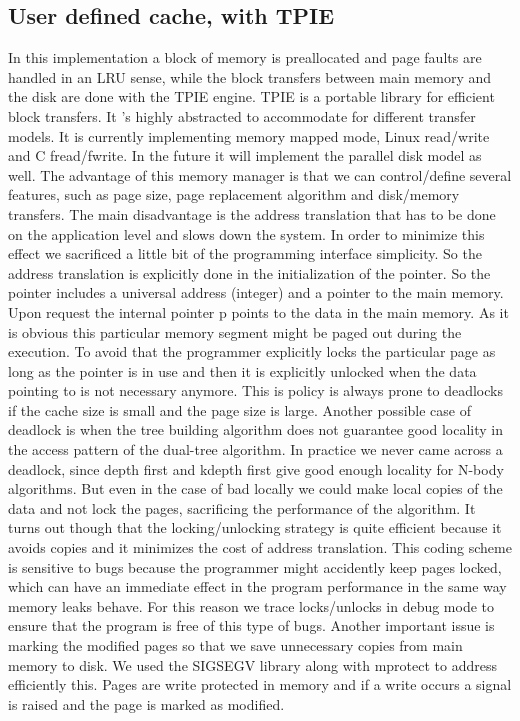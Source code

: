 \documentclass[12pt,letterpaper,doublespaced,ETD,dvips,proposal]{gtthesis}
\begin{document}
\begin{Body}
\subsection{User defined cache, with TPIE} In this implementation a
block of memory is preallocated and page faults are handled in an
LRU sense, while the block transfers between main memory and the
disk are done with the TPIE engine. TPIE is a portable library for
efficient block transfers. It 's highly abstracted to accommodate
for different transfer models. It is currently implementing memory
mapped mode, Linux read/write and C fread/fwrite. In the future it
will implement the parallel disk model as well. The advantage of
this memory manager is that we can control/define several features,
such as page size, page replacement algorithm and disk/memory
transfers. The main disadvantage is the address translation that has
to be done on the application level and slows down the system. In
order to minimize this effect we sacrificed a little bit of the
programming interface simplicity. So the address translation is
explicitly done in the initialization of the pointer. So the pointer
includes a universal address (integer) and a pointer to the main
memory. Upon request the internal pointer p points to the data in
the main memory. As it is obvious this particular memory segment
might be paged out during the execution. To avoid that the
programmer explicitly locks the particular page as long as the
pointer is in use and then it is explicitly unlocked when the data
pointing to is not necessary anymore. This is  policy is always
prone to deadlocks if the cache size is small and the page size is
large. Another possible case of deadlock is when the tree building
algorithm does not guarantee good locality in the access pattern of
the dual-tree algorithm. In practice we never came across a
deadlock, since depth first and kdepth first give good enough
locality for N-body algorithms. But even in the case of bad locally
we could make local copies of the data and not lock the pages,
sacrificing the performance of the algorithm. It turns out though
that the locking/unlocking strategy is quite efficient because it
avoids copies and it minimizes the cost of address translation. This
coding scheme is sensitive to bugs because the programmer might
accidently keep pages locked, which can have an immediate effect in
the program performance in the same way memory leaks behave. For
this reason we trace locks/unlocks in debug mode to ensure that the
program is free of this type of bugs. Another important issue is
marking the modified pages so that we save unnecessary copies from
main memory to disk. We used the SIGSEGV library along with mprotect
to address efficiently this. Pages are write protected in memory and
if a write occurs a signal is raised and the page is marked as
modified.





\end{Body}
\end{document}
